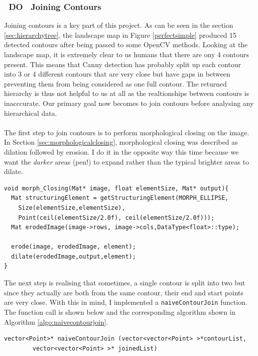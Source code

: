 \documentclass[11pt]{article}
\begin{document}
\subsubsection{~DO~ Joining Contours}
Joining contours is a key part of this project. As can be seen in the
section \ref{sec:hierarchytree}, the landscape map in Figure 
\ref{perfectsimple} produced 15 detected contours after being
passed to some OpenCV methods. Looking at the landscape map, it is
extremely clear to us humans that there are ony 4 contours present.
This means that Canny detection has probably split up each contour into
3 or 4 different contours that are very close but have gaps in between
preventing them from being considered as one full contour. The returned
hierarchy is thus not helpful to us at all as the realtionships between
contours is inacccurate. Our primary goal now becomes to join contours
before analysing any hierarchical data.\\
\\
The first step to join contours is to perform morphological closing on 
the image. In Section \ref{sec:morphologicalclosing}, morphological closing 
was described as dilation followed by erosion. I do it in the opposite
way this time because we want the \textit{darker} areas (pen!) to expand
rather than the typical brighter areas to dilate.

\begin{lstlisting}
void morph_Closing(Mat* image, float elementSize, Mat* output){
  Mat structuringElement = getStructuringElement(MORPH_ELLIPSE,
	Size(elementSize,elementSize),
	Point(ceil(elementSize/2.0f), ceil(elementSize/2.0f)));
  Mat erodedImage(image->rows, image->cols,DataType<float>::type);
  
  erode(image, erodedImage, element);
  dilate(erodedImage,output,element);
}
\end{lstlisting}

The next step is realising that sometimes, a single contour is split into
two but since they actually are both from the same contour, their end and
start points are very close. With this in mind, I implemented a 
\texttt{naiveContourJoin} function. The function call is shown below and
the corresponding algorithm shown in Algorithm \ref{algo:naivecontourjoin}.

\begin{lstlisting}
vector<Point>* naiveContourJoin (vector<vector<Point> >*contourList, 
		vector<vector<Point> >* joinedList)
\end{lstlisting}
\end{document}
